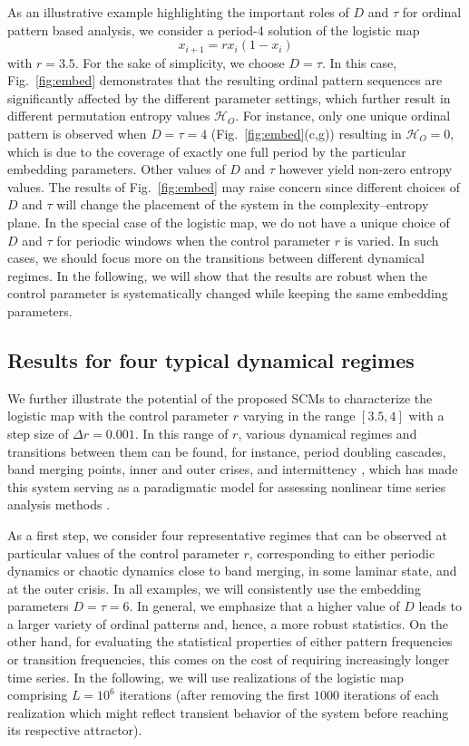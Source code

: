 \documentclass[12pt,aip,cha,reprint,nofootinbib]{revtex4-1}
\begin{document}
As an illustrative example highlighting the important roles of $D$ and $\tau$ for ordinal pattern based analysis, we consider a period-4 solution of the logistic map 
\begin{equation}
x_{i+1}=rx_i(1-x_i) 
\end{equation}
\noindent
with $r= 3.5$. For the sake of simplicity, we choose $D = \tau $. In this case, Fig.~\ref{fig:embed} demonstrates that the resulting ordinal pattern sequences are significantly affected by the different parameter settings, which further result in different permutation entropy values $\mathcal{H}_O$. For instance, only one unique ordinal pattern is observed when $D = \tau = 4$ (Fig.~\ref{fig:embed}(c,g)) resulting in $\mathcal{H}_O = 0$, which is due to the coverage of exactly one full period by the particular embedding parameters. Other values of $D$ and $\tau$ however yield non-zero entropy values. The results of Fig.~\ref{fig:embed} may raise concern since different choices of $D$ and $\tau$ will change the placement of the system in the complexity--entropy plane. In the special case of the logistic map, we do not have a unique choice of $D$ and $\tau$ for periodic windows when the control parameter $r$ is varied. In such cases, we should focus more on the transitions between different dynamical regimes. In the following, we will show that the results are robust when the control parameter is systematically changed while keeping the same embedding parameters.

\subsection{Results for four typical dynamical regimes} \label{sec:four}

We further illustrate the potential of the proposed SCMs to characterize the logistic map with the control parameter $r$ varying in the range $[3.5, 4]$ with a step size of $\Delta r = 0.001$. In this range of $r$, various dynamical regimes and transitions between them can be found, for instance, period doubling cascades, band merging points, inner and outer crises, and intermittency \cite{Kantz97}, which has made this system serving as a paradigmatic model for assessing nonlinear time series analysis methods \cite{MarwanPLA2009}. 

As a first step, we consider four representative regimes that can be observed at particular values of the control parameter $r$, corresponding to either periodic dynamics or chaotic dynamics close to band merging, in some laminar state, and at the outer crisis. In all examples, we will consistently use the embedding parameters $D = \tau = 6$. In general, we emphasize that a higher value of $D$ leads to a larger variety of ordinal patterns and, hence, a more robust statistics. On the other hand, for evaluating the statistical properties of either pattern frequencies or transition frequencies, this comes on the cost of requiring increasingly longer time series. In the following, we will use realizations of the logistic map comprising $L = 10^6$ iterations (after removing the first $1000$ iterations of each realization which might reflect transient behavior of the system before reaching its respective attractor). 
\end{document}
